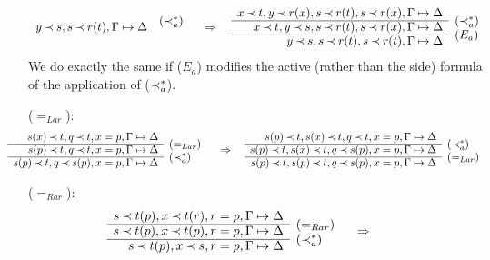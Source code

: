 \begin{PROOF}
\begin{LS}
\[\begin{array}{rl}
          y\Incl s, s\Incl r(t), \GSD  & \rabove{(\Incl_a^*)} \end{array}
  \conv
 \begin{array}{rl}
x\Incl t, y\Incl r(x), s\Incl r(t), s\Incl r(x),\GSD \\ \cline{1-1}
x\Incl t, y\Incl s, s\Incl r(t), s\Incl r(x),\GSD  & \rabove{(\Incl_a^*)} \\ \cline{1-1}
          y\Incl s, s\Incl r(t), s\Incl r(t),\GSD  & \rabove{(E_a)} \end{array} \]
%
We do exactly the same if ($E_a$) modifies the active (rather than the side)
formula of the application of ($\mathbin{\prec}_a^*$).
\item ($=_{Lar}$): 
\[ \hspace*{-2em}\begin{array}{rl}
s(x)\Incl t, q\Incl t, x=p, \GSD \\ \cline{1-1}
s(p)\Incl t, q\Incl t, x=p, \GSD & \rabove{(=_{Lar})} \\ \cline{1-1}
s(p)\Incl t, q\Incl s(p), x=p, \GSD & \rabove{(\Incl_a^*)} \end{array} \conv
\begin{array}{rl}
s(p)\Incl t,s(x)\Incl t, q\Incl t, x=p, \GSD \\ \cline{1-1}
s(p)\Incl t,s(x)\Incl t, q\Incl s(p), x=p, \GSD & \rabove{(\Incl_a^*)} \\ \cline{1-1}
s(p)\Incl t,s(p)\Incl t, q\Incl s(p), x=p, \GSD & \rabove{(=_{Lar})} \end{array}
\]
\item ($=_{Rar}$):
\[ \hspace*{-2em} \begin{array}{rl}
s\Incl t(p), x\Incl t(r), r=p, \GSD \\ \cline{1-1}
s\Incl t(p), x\Incl t(p), r=p, \GSD & \rabove{(=_{Rar})}\\ \cline{1-1}
s\Incl t(p), x\Incl s, r=p, \GSD & \rabove{(\Incl_a^*)} \end{array} \conv
\]
\end{LS}
\end{PROOF}
